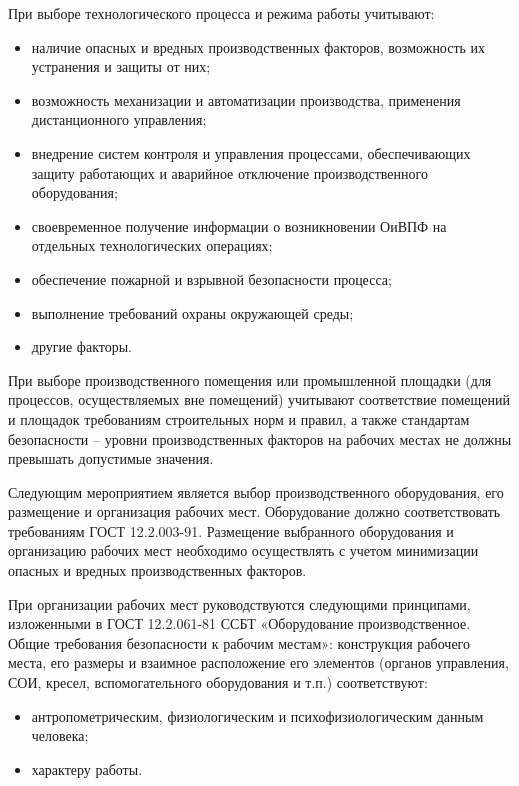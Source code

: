         При выборе технологического процесса и режима работы  учитывают: 
        \begin{itemize}
            \item наличие опасных и вредных производственных факторов,
                возможность их устранения и защиты от них;
            \item возможность механизации и автоматизации производства,
                применения дистанционного управления;
            \item внедрение систем контроля и управления процессами,
                обеспечивающих защиту работающих и аварийное отключение
                производственного оборудования;
            \item своевременное получение информации о возникновении ОиВПФ на
                отдельных технологических операциях;
            \item обеспечение пожарной и взрывной безопасности процесса;
            \item выполнение требований охраны окружающей среды;
            \item другие факторы.
        \end{itemize}

        При выборе производственного помещения или промышленной площадки (для
        процессов, осуществляемых вне помещений) учитывают соответствие
        помещений и площадок требованиям строительных норм и правил, а также
        стандартам безопасности – уровни производственных факторов на рабочих
        местах не должны превышать допустимые значения. 

        Следующим мероприятием является выбор производственного оборудования,
        его размещение и организация рабочих мест. Оборудование должно
        соответствовать требованиям ГОСТ 12.2.003-91.  Размещение выбранного
        оборудования и организацию рабочих мест необходимо осуществлять с
        учетом минимизации опасных и вредных производственных факторов. 

        При организации рабочих мест руководствуются следующими принципами,
        изложенными в ГОСТ 12.2.061-81 ССБТ «Оборудование производственное.
        Общие требования безопасности к рабочим местам»: конструкция рабочего
        места, его размеры и взаимное расположение его элементов (органов
        управления, СОИ, кресел, вспомогательного оборудования и т.п.)
        соответствуют:
        \begin{itemize}
            \item антропометрическим, физиологическим и психофизиологическим
            данным человека;
            \item характеру работы.
        \end{itemize}

